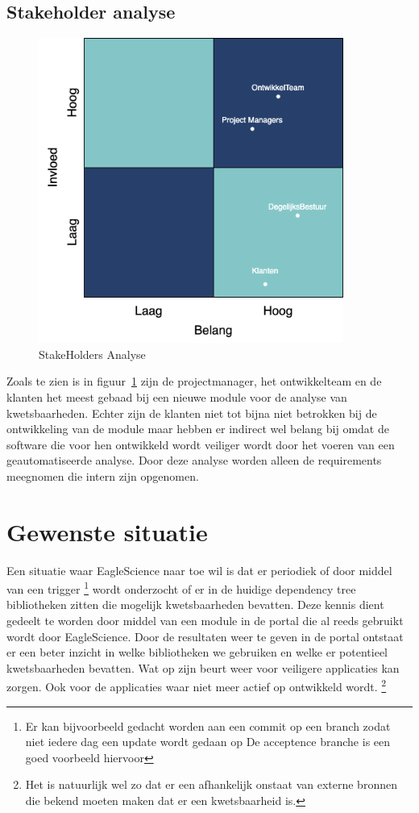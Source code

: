 \subsection{Stakeholder analyse}\label{subsec:stakeholder-analyse}
\begin{figure}[H]
    \myfloatalign
    \includegraphics[width=10cm]{gfx/stakeholderanalyse}
    \caption{StakeHolders Analyse}
    \label{fig:StakeholderAnalyse}
\end{figure}
Zoals te zien is in figuur~\ref{fig:StakeholderAnalyse} zijn de projectmanager, het ontwikkelteam en de klanten het meest gebaad bij een nieuwe module voor de analyse van kwetsbaarheden.
Echter zijn de klanten niet tot bijna niet betrokken bij de ontwikkeling van de module maar hebben er indirect wel belang bij omdat de software die voor hen ontwikkeld wordt veiliger wordt door het voeren van een geautomatiseerde analyse.
Door deze analyse worden alleen de requirements meegnomen die intern zijn opgenomen.


\section{Gewenste situatie}\label{sec:gewenste-situatie}
Een situatie waar EagleScience naar toe wil is dat er periodiek of door middel van een trigger \footnote{Er kan bijvoorbeeld gedacht worden aan een commit op een branch zodat niet iedere dag een update wordt gedaan op De acceptence branche is een goed voorbeeld hiervoor} wordt onderzocht of er in de huidige dependency tree bibliotheken zitten die mogelijk kwetsbaarheden bevatten. Deze kennis dient gedeelt te worden door middel van een module in de portal die al reeds gebruikt wordt door EagleScience. Door de resultaten weer te geven in de portal ontstaat er een beter inzicht in welke bibliotheken we gebruiken en welke er potentieel kwetsbaarheden bevatten. Wat op zijn beurt weer voor veiligere applicaties kan zorgen. Ook voor de applicaties waar niet meer actief op ontwikkeld wordt. \footnote{Het is natuurlijk wel zo dat er een afhankelijk onstaat van externe bronnen die bekend moeten maken dat er een kwetsbaarheid is.}

